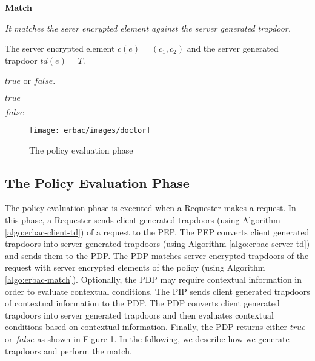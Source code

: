 \documentclass[epsfig,a4paper,11pt,titlepage]{book}
\numberwithin{algorithm}{chapter}
\newcommand{\algofontsize}{\fontsize{11}{12}\selectfont}
\begin{document}
\begin{algorithm} [htp]
{\algofontsize
\caption{\textbf{Match}}

\label{algo:erbac-match}

\begin{algorithmic}[1]

\INPUT \emph{It matches the serer encrypted element against the server generated trapdoor.}

\Require The server encrypted element $c(e) = (c_1, c_2)$ and the server generated trapdoor $td(e) = T$.

\Ensure $\mathit{true}$ or $\mathit{false}$.

\medskip

 \label{line:erbac-match-condition}

	\Return $\mathit{true}$ \label{line:erbac-match-true}
	
\Else

	\Return $\mathit{false}$ \label{line:erbac-match-false}
	
\EndIf

\end{algorithmic}
}
\end{algorithm}


\begin{figure} [htp]
\centering
\texttt{[image: erbac/images/doctor]} \caption{The policy evaluation phase}
\label{fig:erbac-doctor}
\end{figure}


\subsection{The Policy Evaluation Phase}

The policy evaluation phase is executed when a Requester makes a request. In this phase, a Requester sends client generated trapdoors (using Algorithm \ref{algo:erbac-client-td}) of a request to the \gls{PEP}. The \gls{PEP} converts client generated trapdoors into server generated trapdoors (using Algorithm \ref{algo:erbac-server-td}) and sends them to the \gls{PDP}. The \gls{PDP} matches server encrypted trapdoors of the request with server encrypted elements of the policy (using Algorithm \ref{algo:erbac-match}). Optionally, the \gls{PDP} may require contextual information in order to evaluate contextual conditions. The \gls{PIP} sends client generated trapdoors of contextual information to the \gls{PDP}. The \gls{PDP} converts client generated trapdoors into server generated trapdoors and then evaluates contextual conditions based on contextual information. Finally, the \gls{PDP} returns either $\mathit{true}$ or $\mathit{false}$ as shown in Figure \ref{fig:erbac-doctor}. In the following, we describe how we generate trapdoors and perform the match. 
\end{document}

